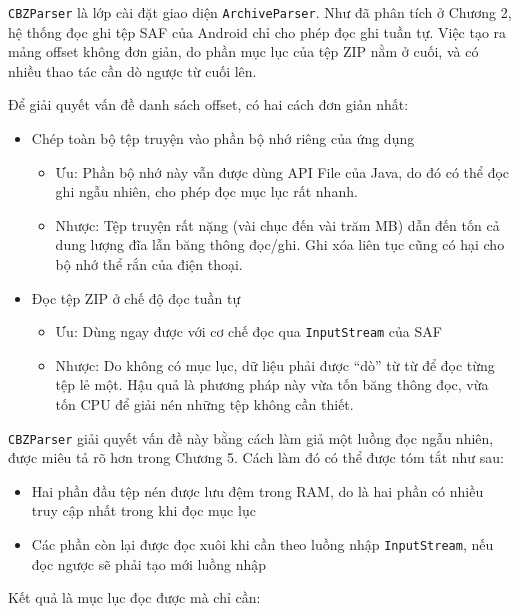 \documentclass[
]{article}
\begin{document}
\texttt{CBZParser} là lớp cài đặt giao diện \texttt{ArchiveParser}. Như
đã phân tích ở Chương 2, hệ thống đọc ghi tệp SAF của Android chỉ cho
phép đọc ghi tuần tự. Việc tạo ra mảng offset không đơn giản, do phần
mục lục của tệp ZIP nằm ở cuối, và có nhiều thao tác cần dò ngược từ
cuối lên.

Để giải quyết vấn đề danh sách offset, có hai cách đơn giản nhất:

\begin{itemize}
\item
  Chép toàn bộ tệp truyện vào phần bộ nhớ riêng của ứng dụng

  \begin{itemize}
  \item
    Ưu: Phần bộ nhớ này vẫn được dùng API File của Java, do đó có thể
    đọc ghi ngẫu nhiên, cho phép đọc mục lục rất nhanh.
  \item
    Nhược: Tệp truyện rất nặng (vài chục đến vài trăm MB) dẫn đến tốn cả
    dung lượng đĩa lẫn băng thông đọc/ghi. Ghi xóa liên tục cũng có hại
    cho bộ nhớ thể rắn của điện thoại.
  \end{itemize}
\item
  Đọc tệp ZIP ở chế độ đọc tuần tự

  \begin{itemize}
    \item
    Ưu: Dùng ngay được với cơ chế đọc qua \texttt{InputStream} của SAF
  \item
    Nhược: Do không có mục lục, dữ liệu phải được ``dò'' từ từ để đọc
    từng tệp lẻ một. Hậu quả là phương pháp này vừa tốn băng thông đọc,
    vừa tốn CPU để giải nén những tệp không cần thiết.
  \end{itemize}
\end{itemize}

\texttt{CBZParser} giải quyết vấn đề này bằng cách làm giả một luồng đọc
ngẫu nhiên, được miêu tả rõ hơn trong Chương 5. Cách làm đó có thể được
tóm tắt như sau:

\begin{itemize}
\item
  Hai phần đầu tệp nén được lưu đệm trong RAM, do là hai phần có nhiều
  truy cập nhất trong khi đọc mục lục
\item
  Các phần còn lại được đọc xuôi khi cần theo luồng nhập
  \texttt{InputStream}, nếu đọc ngược sẽ phải tạo mới luồng nhập
\end{itemize}

Kết quả là mục lục đọc được mà chỉ cần:
\end{document}
